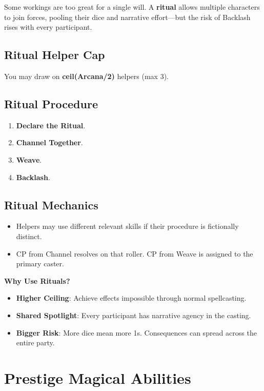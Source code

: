 Some workings are too great for a single will. A \textbf{ritual} allows multiple characters to join forces, pooling their dice and narrative effort—but the risk of Backlash rises with every participant.

\subsection*{Ritual Helper Cap}

You may draw on \textbf{ceil(Arcana/2)} helpers (max 3).

\subsection*{Ritual Procedure}

\begin{enumerate}
    \item \textbf{Declare the Ritual}.
    \item \textbf{Channel Together}.
    \item \textbf{Weave}.
    \item \textbf{Backlash}.
\end{enumerate}

\subsection*{Ritual Mechanics}

\begin{itemize}
    \item Helpers may use different relevant skills if their procedure is fictionally distinct.
    \item CP from Channel resolves on that roller. CP from Weave is assigned to the primary caster.
\end{itemize}

\textbf{Why Use Rituals?}

\begin{itemize}
    \item \textbf{Higher Ceiling}: Achieve effects impossible through normal spellcasting.
    \item \textbf{Shared Spotlight}: Every participant has narrative agency in the casting.
    \item \textbf{Bigger Risk}: More dice mean more 1s. Consequences can spread across the entire party.
\end{itemize}

\section*{Prestige Magical Abilities}

